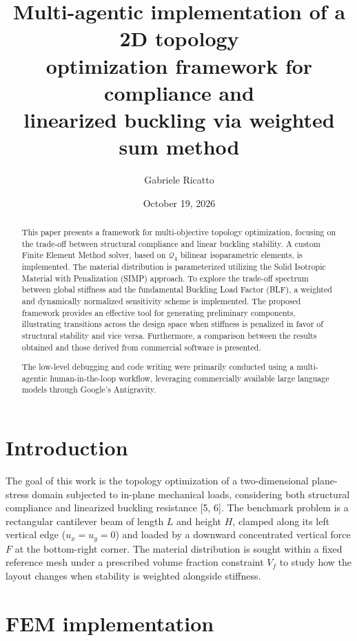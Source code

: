 \documentclass{article}
\title{Multi-agentic implementation of a 2D topology \\ optimization framework for compliance and \\ linearized buckling via weighted sum method}
\author{Gabriele Ricatto}
\date{October 19, 2026}
\begin{document}
\maketitle

\begin{abstract}
This paper presents a framework for multi-objective topology optimization, focusing on the trade-off between structural compliance and linear buckling stability. A custom Finite Element Method solver, based on $\mathcal{Q}_4$ bilinear isoparametric elements, is implemented. The material distribution is parameterized utilizing the Solid Isotropic Material with Penalization (SIMP) approach. To explore the trade-off spectrum between global stiffness and the fundamental Buckling Load Factor (BLF), a weighted and dynamically normalized sensitivity scheme is implemented. The proposed framework provides an effective tool for generating preliminary components, illustrating transitions across the design space when stiffness is penalized in favor of structural stability and vice versa. Furthermore, a comparison between the results obtained and those derived from commercial software is presented.

The low-level debugging and code writing were primarily conducted using a multi-agentic human-in-the-loop workflow, leveraging commercially available large language models through Google's Antigravity.
\end{abstract}

\newpage

\section{Introduction}

\noindent The goal of this work is the topology optimization of a two-dimensional plane-stress domain subjected to in-plane mechanical loads, considering both structural compliance and linearized buckling resistance [5, 6]. The benchmark problem is a rectangular cantilever beam of length $L$ and height $H$, clamped along its left vertical edge ($u_x = u_y = 0$) and loaded by a downward concentrated vertical force $F$ at the bottom-right corner. The material distribution is sought within a fixed reference mesh under a prescribed volume fraction constraint $V_f$ to study how the layout changes when stability is weighted alongside stiffness.

\section{FEM implementation}
\end{document}
